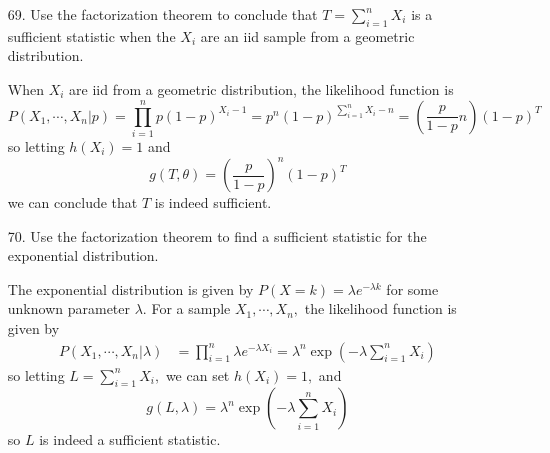 \documentclass{article}
\begin{document}
\begin{itemize}
\begin{enumerate}[a.]
\begin{soln}
				\end{soln}

			\item Use Theorem A of section 8.8.1 to show that $T$ is sufficient. Identify the functions $g$ and $h$ of that theorem.
				\begin{proof}
					The likelihood function is given by \[\prod_{i=1}^{n} P(X_i=x_i)=\prod_{i=1}^{n}\frac{\lambda^{x_i}e^{-\lambda}}{x_i!} = e^{-n\lambda} \lambda^{\sum_{i=1}^{n} x_i}\prod_{i=1}^{n} \frac{1}{x_i!}=e^{-n\lambda} \lambda^T \prod_{i=1}^{n}\frac{1}{x_i!}\] so by the factorization theorem, $T$ is sufficient, as desired. The functions $g$ and $h$ are given by
					\begin{align*}
						h(x_1, \cdots, x_n) &= \prod_{i=1}^{n}\frac{1}{x_i!} \\
						g(T, \lambda) &= e^{-n\lambda} \lambda^T
					\end{align*}
					
				\end{proof}
				
		\end{enumerate}

	\item[69.] Use the factorization theorem to conclude that $\displaystyle T=\sum_{i=1}^{n} X_i$ is a sufficient statistic when the $X_i$ are an iid sample from a geometric distribution.
		\begin{soln}
			When $X_i$ are iid from a geometric distribution, the likelihood function is \[P(X_1, \cdots, X_n|p) = \prod_{i=1}^n p(1-p)^{X_i-1} = p^n (1-p)^{\sum_{i=1}^{n} X_i - n} = \left( \frac{p}{1-p}n \right)(1-p)^T\] so letting $h(X_i) = 1$ and \[g(T, \theta) = \left( \frac{p}{1-p} \right)^n (1-p)^T\] we can conclude that $T$ is indeed sufficient.
			
		\end{soln}

	\item[70.] Use the factorization theorem to find a sufficient statistic for the exponential distribution.
		\begin{soln}
			The exponential distribution is given by $P(X=k)=\lambda e^{-\lambda k}$ for some unknown parameter $\lambda.$ For a sample $X_1, \cdots, X_n,$ the likelihood function is given by 
			\begin{align*}
				P(X_1, \cdots, X_n|\lambda) &= \prod_{i=1}^n \lambda e^{-\lambda X_i} = \lambda^n \exp{\left( -\lambda \sum_{i=1}^{n} X_i \right)}
			\end{align*} so letting $L=\displaystyle \sum_{i=1}^{n} X_i,$ we can set $h(X_i)=1,$ and \[g(L, \lambda) = \lambda^n \exp{\left( -\lambda\sum_{i=1}^{n} X_i \right)}\] so $L$ is indeed a sufficient statistic.
			

\end{soln}
\end{itemize}
\end{document}
